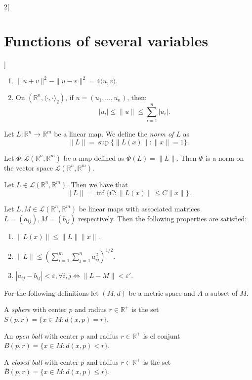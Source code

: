 \documentclass[class=article,10pt,crop=false]{standalone}
\begin{document}
\begin{multicols}{2}[\section{Functions of several variables}]
\begin{prop}
\begin{enumerate}
    \item $\|u+v\|^2-\|u-v\|^2=4\langle u,v\rangle$.
    \item On $(\mathbb{R}^n,\langle\cdot,\cdot\rangle_2)$, if $u=(u_1,\ldots,u_n)$, then: $$|u_i|\leq\|u\|\leq\sum_{i=1}^n|u_i|.$$
\end{enumerate}
\end{prop}
\begin{definition}
Let $L:\mathbb{R}^n\rightarrow\mathbb{R}^m$ be a linear map. We define the \textit{norm of $L$} as $$\|L\|=\sup\{\|L(x)\|:\|x\|=1\}.$$
\end{definition}
\begin{lemma}
Let $\Phi:\mathcal{L}(\mathbb{R}^n,\mathbb{R}^m)$ be a map defined as $\Phi(L)=\|L\|$. Then $\Phi$ is a norm on the vector space $\mathcal{L}(\mathbb{R}^n,\mathbb{R}^m)$.
\end{lemma}
\begin{prop}
Let $L\in\mathcal{L}(\mathbb{R}^n,\mathbb{R}^m)$. Then we have that $$\|L\|=\inf\{C:\|L(x)\|\leq C\|x\|\}.$$
\end{prop}
\begin{corollary}
Let $L,M\in\mathcal{L}(\mathbb{R}^n,\mathbb{R}^m)$ be linear maps with associated matrices $L=(a_{ij}),M=(b_{ij})$ respectively. Then the following properties are satisfied:
\begin{enumerate}
    \item $\|L(x)\|\leq\|L\|\|x\|$.
    \item $\displaystyle\|L\|\leq\left(\sum_{i=1}^m\sum_{j=1}^na_{ij}^2\right)^{1/2}$.
    \item $|a_{ij}-b_{ij}|<\varepsilon,\forall i,j\iff\|L-M\|<\varepsilon'$.
\end{enumerate}
\end{corollary}
\noindent For the following definitions let $(M,d)$ be a metric space and $A$ a subset of $M$.
\begin{definition}
A \textit{sphere} with center $p$ and radius $r\in\mathbb{R}^+$ is the set $S(p,r)=\{x\in M:d(x,p)=r\}$.
\end{definition}
\begin{definition}
An \textit{open ball} with center $p$ and radius $r\in\mathbb{R}^+$ is el conjunt $B(p,r)=\{x\in M:d(x,p)<r\}$.
\end{definition}
\begin{definition}
A \textit{closed ball} with center $p$ and radius $r\in\mathbb{R}^+$ is the set $\overline{B}(p,r)=\{x\in M:d(x,p)\leq r\}$.
\end{definition}

\end{multicols}
\end{document}
